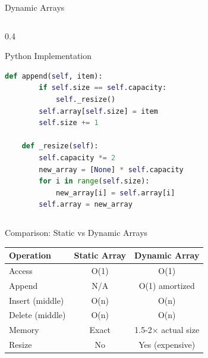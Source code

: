 \documentclass[aspectratio=169,xcolor=dvipsnames]{beamer}
\begin{document}
\begin{frame}[fragile]{Dynamic Arrays}
\begin{columns}
\begin{column}{0.4\textwidth}
\begin{exampleblock}{Python Implementation}
\begin{lstlisting}[language=Python,basicstyle=\tiny\ttfamily]
    def append(self, item):
        if self.size == self.capacity:
            self._resize()
        self.array[self.size] = item
        self.size += 1

    def _resize(self):
        self.capacity *= 2
        new_array = [None] * self.capacity
        for i in range(self.size):
            new_array[i] = self.array[i]
        self.array = new_array
        \end{lstlisting}
      \end{exampleblock}
    \end{column}
  \end{columns}
\end{frame}

\begin{frame}{Comparison: Static vs Dynamic Arrays}
  \begin{center}
    \begin{tabular}{l|c|c}
      \toprule
      \textbf{Operation} & \textbf{Static Array} & \textbf{Dynamic Array} \\
      \midrule
      Access & O(1) & O(1) \\
      Append & N/A & O(1) amortized \\
      Insert (middle) & O(n) & O(n) \\
      Delete (middle) & O(n) & O(n) \\
      Memory & Exact & 1.5-2× actual size \\
      Resize & No & Yes (expensive) \\
      \bottomrule
    \end{tabular}
  \end{center}

  \vspace{0.5cm}


\end{frame}
\end{document}
